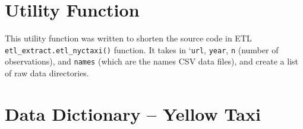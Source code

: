 \documentclass[12pt,twoside]{reedthesis}
\newenvironment{Shaded}{\begin{snugshade}}{\end{snugshade}}
\newcommand{\KeywordTok}[1]{\textcolor[rgb]{0.13,0.29,0.53}{\textbf{#1}}}
\newcommand{\DataTypeTok}[1]{\textcolor[rgb]{0.13,0.29,0.53}{#1}}
\newcommand{\StringTok}[1]{\textcolor[rgb]{0.31,0.60,0.02}{#1}}
\newcommand{\ControlFlowTok}[1]{\textcolor[rgb]{0.13,0.29,0.53}{\textbf{#1}}}
\newcommand{\OperatorTok}[1]{\textcolor[rgb]{0.81,0.36,0.00}{\textbf{#1}}}
\newcommand{\NormalTok}[1]{#1}
\theoremstyle{definition}
\theoremstyle{definition}
\theoremstyle{definition}
\theoremstyle{remark}
\begin{document}
\appendix

\chapter{Utility Function}\label{utility-function}

This utility function was written to shorten the source code in ETL
\texttt{etl\_extract.etl\_nyctaxi()} function. It takes in
`\texttt{url}, \texttt{year}, \texttt{n} (number of observations), and
\texttt{names} (which are the names CSV data files), and create a list
of raw data directories.
\begin{Shaded}
\end{Shaded}
\chapter{Data Dictionary -- Yellow
Taxi}\label{data-dictionary-yellow-taxi}
\end{document}

